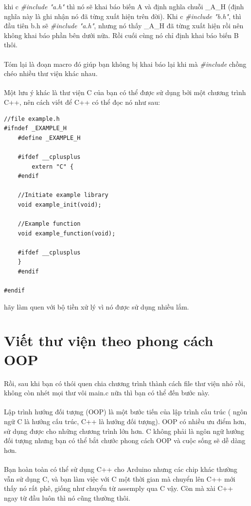 \documentclass[12pt,a5paper]{book}
\begin{document}
khi c \textit{\#include "a.h"} thì nó sẽ khai báo biến A và định nghĩa chuỗi \_A\_H (định nghĩa này là ghi nhận nó đã từng xuất hiện trên đời). Khi c \textit{\#include "b.h"}, thì đầu tiên b.h sẽ  \textit{\#include "a.h"}, nhưng nó thấy \_A\_H đã từng xuất hiện rồi nên không khai báo phần bên dưới nữa. Rồi cuối cùng nó chỉ định khai báo biến B thôi.
\paragraph{}
Tóm lại là đoạn macro đó giúp bạn không bị khai báo lại khi mà \textit{\#include} chồng chéo nhiều thư viện khác nhau.
\paragraph{}
Một lưu ý khác là thư viện C của bạn có thể được sử dụng bởi một chương trình C++, nên cách viết để C++ có thể đọc nó như sau:
\begin{lstlisting}
//file example.h
#ifndef _EXAMPLE_H
	#define _EXAMPLE_H
	
	#ifdef __cplusplus
 		extern "C" {
	#endif

	//Initiate example library 
	void example_init(void);

	//Example function
	void example_function(void);
	
	#ifdef __cplusplus
	}
	#endif
	
#endif
\end{lstlisting}
hãy làm quen với bộ tiền xử lý vì nó được sử dụng nhiều lắm.
\section{Viết thư viện theo phong cách OOP}
\paragraph{}
Rồi, sau khi bạn có thói quen chia chương trình thành cách file thư viện nhỏ rồi, không còn nhét mọi thư vôi main.c nữa thì bạn có thể đến bước này.
\paragraph{}
Lập trình hướng đối tượng (OOP) là một bước tiến của lập trình cấu trúc ( ngôn ngữ C là hướng cấu trúc, C++ là hướng đối tượng). OOP có nhiều ưu điểm hơn, sử dụng được cho những chương trình lớn hơn. C không phải là ngôn ngữ hướng đối tượng nhưng bạn có thể bắt chước phong cách OOP và cuộc sống sẽ dễ dàng hơn.
\paragraph{}
Bạn hoàn toàn có thể sử dụng C++ cho Arduino nhưng các chip khác thường vẫn sử dụng C, và bạn làm việc với C một thời gian mà chuyển lên C++ mới thấy nó rất phê, giống như chuyển từ assemply qua C vậy. Còn mà xài C++ ngay từ đầu luôn thì nó cũng thường thôi.
\end{document}
